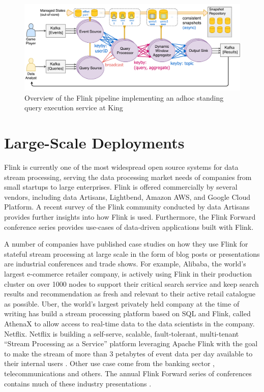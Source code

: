 \begin{figure}[t]
\centering
\includegraphics[width=\textwidth]{figures/rbea.pdf}
\caption{Overview of the Flink pipeline implementing an adhoc standing query execution service at King} 
\label{fig:rbea}
\vspace{-4mm}
\end{figure}



\section{Large-Scale Deployments}
\label{sec:evaluation}

Flink is currently one of the most widespread open source systems for data stream processing, serving the data processing market needs of companies from small startups to large enterprises. Flink is offered commercially by several vendors, including data Artisans, Lightbend, Amazon AWS, and Google Cloud Platform. A recent survey of the Flink community conducted by data Artisans \cite{CUSTOM:web/dartisanssurvey} provides further insights into how Flink is used. Furthermore, the Flink Forward conference series \cite{CUSTOM:web/flinkforward} provides use-cases of data-driven applications built with Flink. 

A number of companies have published case studies on how they use Flink for stateful stream processing at large scale in the form of blog posts or presentations are industrial conferences and trade shows. For example, {Alibaba}, the world's largest e-commerce retailer company, is actively using Flink in their production cluster on over 1000 nodes to support their critical search service \cite{CUSTOM:web/alibaba} and keep search results and recommendation as fresh and relevant to their active retail catalogue as possible. {Uber}, the world's largest privately held company at the time of writing has build a stream processing platform based on SQL and Flink, called {AthenaX}\cite{CUSTOM:web/uber} to allow access to real-time data to the data scientists in the company. {Netflix}. {Netflix} is building a self-serve, scalable, fault-tolerant, multi-tenant “Stream Processing as a Service” platform leveraging Apache Flink with the goal to make the stream of more than 3 petabytes of event data per day available to their internal users \cite{CUSTOM:web/netflix}. Other use case come from the banking sector \cite{CUSTOM:web/ing}, telecommunications \cite{CUSTOM:web/bouygues} and others. The annual Flink Forward series of conferences contains much of these industry presentations \cite{CUSTOM:web/flinkforward}.

